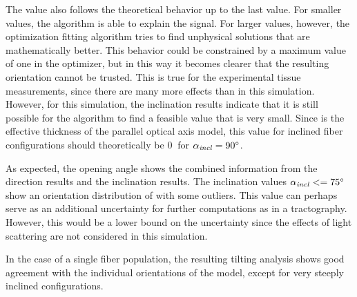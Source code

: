 \par
%
The \trel{} value also follows the theoretical behavior up to the last value.
For smaller \trel{} values, the algorithm is able to explain the signal.
For larger \trel{} values, however, the optimization fitting algorithm tries to find unphysical solutions that are mathematically better.
This behavior could be constrained by a maximum \trel{} value of one in the optimizer, but in this way it becomes clearer that the resulting orientation cannot be trusted.
This is true for the experimental tissue measurements, since there are many more effects than in this simulation.
However, for this simulation, the inclination results indicate that it is still possible for the algorithm to find a feasible \trel{} value that is very small.
Since \trel{} is the effective thickness of the parallel optical axis model, this value for inclined fiber configurations should theoretically be $\SI{0}{}$ for $\textnormal{$\alpha_{\mathit{incl}}$}=\SI{90}{\degree}$.
\par
%
As expected, the opening angle shows the combined information from the direction results and the inclination results.
The inclination values $\textnormal{$\alpha_{\mathit{incl}}$} <= \SI{75}{\degree}$ show an orientation distribution of \dummy{} with some outliers.
This value can perhaps serve as an additional uncertainty for further computations as in a tractography.
However, this would be a lower bound on the uncertainty since the effects of light scattering are not considered in this simulation.
\par
%
In the case of a single fiber population, the resulting tilting analysis shows good agreement with the individual orientations of the model, except for very steeply inclined configurations.
%

